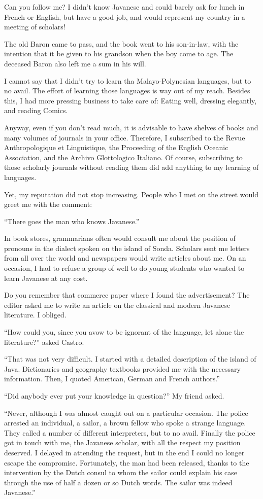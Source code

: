 \documentclass[a4paper,12pt]{book}
\begin{document}
Can you follow me? I didn't know Javanese
and could barely ask for lunch in French
or English, but have a good job, and would
represent my country in a meeting of scholars!

The old Baron came to pass,
and the book went to his son-in-law,
with the intention that it be given
to his grandson when the boy come to age.
The deceased Baron also left me a sum
in his will.

I cannot say that I didn't try to learn
tha Malayo-Polynesian languages, but to
no avail. The effort of learning those
languages is way out of my reach.
Besides this, I had more pressing
business to take care of: Eating well, dressing
elegantly, and reading Comics.

Anyway, even if you don't read much,
it is advisable to have shelves of books
and many volumes of journals in your
office. Therefore, I subscribed to
the Revue Anthropologique et Linguistique,
the Proceeding of the English Oceanic
Association, and the Archivo Glottologico
Italiano. Of course, subscribing to those
scholarly journals without reading
them did add anything to my learning
of languages.


Yet, my reputation did not stop increasing.
People who I met on the street would greet me
with the comment:

``There goes the man who knows Javanese.''

In book stores, grammarians often
would consult me about the position
of pronouns in the dialect spoken
on the island of Sonda.
Scholars sent me letters  from all
over the world and newspapers would write 
articles about me. On an occasion,
I had to refuse a
group of well to do young students
who wanted to learn Javanese at any cost.

Do you remember that commerce paper where
I found the advertisement? The editor
asked me to  write an
article on the classical
and modern Javanese literature.
I obliged.

``How could you, since you avow to be ignorant
of the language, let alone the literature?''
asked  Castro.

``That was not very difficult. I started
with a detailed description of the island
of Java. Dictionaries and
geography textbooks provided me with the necessary
information.
Then, I quoted American, German and French
authors.''

``Did anybody ever put your knowledge in question?'' My friend asked.

``Never, although I was almost caught out on
a particular occasion. The police arrested
an individual, a sailor, a brown fellow who
spoke a strange language. They called a number
of different interpreters, but to no avail.
Finally the police got in touch with me,
the Javanese scholar, with all the respect
my position deserved. I delayed in attending
the request, but in the end I could no longer
escape the compromise. Fortunately, the man
had been released, thanks to the intervention
by the Dutch consul to whom the sailor
could explain his case through the use
of half a dozen or so Dutch words.
The sailor was indeed Javanese.''
\end{document}
